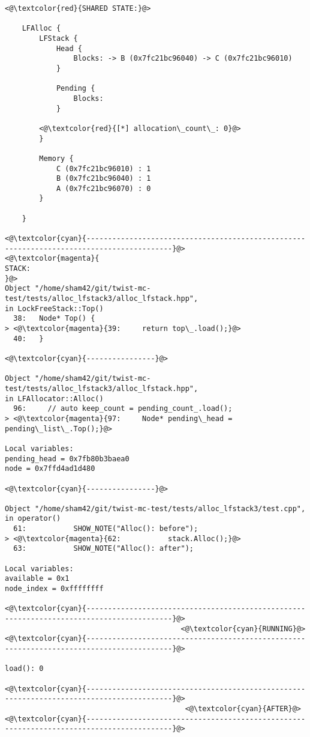 \begin{adjustwidth}{-3.3cm}{-1cm}
\begin{allintypewriter}
\begin{multicols*}{2}
\begin{lstlisting}[numbers=none]
<@\textcolor{red}{SHARED STATE:}@>

    LFAlloc {
	    LFStack {
		    Head {
			    Blocks: -> B (0x7fc21bc96040) -> C (0x7fc21bc96010) 
		    }

		    Pending {
			    Blocks: 
		    }

		<@\textcolor{red}{[*] allocation\_count\_: 0}@>
	    }

	    Memory {
		    C (0x7fc21bc96010) : 1
		    B (0x7fc21bc96040) : 1
		    A (0x7fc21bc96070) : 0
	    }

    }

<@\textcolor{cyan}{------------------------------------------------------------------------------------------}@>
<@\textcolor{magenta}{
STACK:
}@>
Object "/home/sham42/git/twist-mc-test/tests/alloc_lfstack3/alloc_lfstack.hpp",
in LockFreeStack::Top()
  38:   Node* Top() {
> <@\textcolor{magenta}{39:     return top\_.load();}@>
  40:   }

<@\textcolor{cyan}{----------------}@>

Object "/home/sham42/git/twist-mc-test/tests/alloc_lfstack3/alloc_lfstack.hpp",
in LFAllocator::Alloc()
  96:     // auto keep_count = pending_count_.load();
> <@\textcolor{magenta}{97:     Node* pending\_head = pending\_list\_.Top();}@>

Local variables: 
pending_head = 0x7fb80b3baea0
node = 0x7ffd4ad1d480

<@\textcolor{cyan}{----------------}@>

Object "/home/sham42/git/twist-mc-test/tests/alloc_lfstack3/test.cpp",
in operator()
  61:           SHOW_NOTE("Alloc(): before");
> <@\textcolor{magenta}{62:           stack.Alloc();}@>
  63:           SHOW_NOTE("Alloc(): after");

Local variables: 
available = 0x1
node_index = 0xffffffff

<@\textcolor{cyan}{------------------------------------------------------------------------------------------}@>
                                         <@\textcolor{cyan}{RUNNING}@>
<@\textcolor{cyan}{------------------------------------------------------------------------------------------}@>

load(): 0

<@\textcolor{cyan}{------------------------------------------------------------------------------------------}@>
                                          <@\textcolor{cyan}{AFTER}@>
<@\textcolor{cyan}{------------------------------------------------------------------------------------------}@>


\end{lstlisting}
\end{multicols*}
\end{allintypewriter}
\end{adjustwidth}
